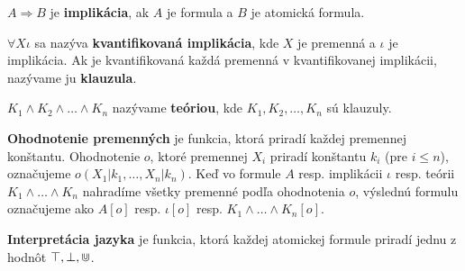 \begin{definition}
$A \Rightarrow B$ je \textbf{implikácia}, ak $A$ je formula a $B$ je atomická formula.
\end{definition}

\begin{definition}
$\forall X \iota $ sa nazýva \textbf{kvantifikovaná implikácia}, kde $X$ je premenná a $\iota$ je
implikácia. Ak je kvantifikovaná každá premenná v kvantifikovanej implikácii, nazývame ju
\textbf{klauzula}.
\end{definition}

\begin{definition}
$K_1 \land K_2 \land \dots \land K_n$ nazývame \textbf{teóriou}, kde $K_1, K_2, \dots, K_n$ sú
klauzuly.
\end{definition}

\begin{definition}
    \label{ohodnotenie_premennych_1}
\textbf{Ohodnotenie premenných} je funkcia, ktorá priradí každej premennej konštantu. Ohodnotenie
$o$, ktoré premennej $X_i$ priradí konštantu $k_i$ (pre $i \leq n$), označujeme $o(X_1 | k_1, \dots
, X_n | k_n)$. Keď vo formule $A$ resp. implikácii $\iota$ resp. teórii $K_1\land \dots \land K_n$
nahradíme všetky premenné podľa ohodnotenia $o$, výslednú formulu označujeme ako $A[o]$ resp.
$\iota[o]$ resp. $K_1\land \dots \land K_n[o]$.
\end{definition}

\begin{definition}
\textbf{Interpretácia jazyka} je funkcia, ktorá každej atomickej formule priradí jednu z hodnôt
$\top, \bot, \Cup$.
\end{definition}

